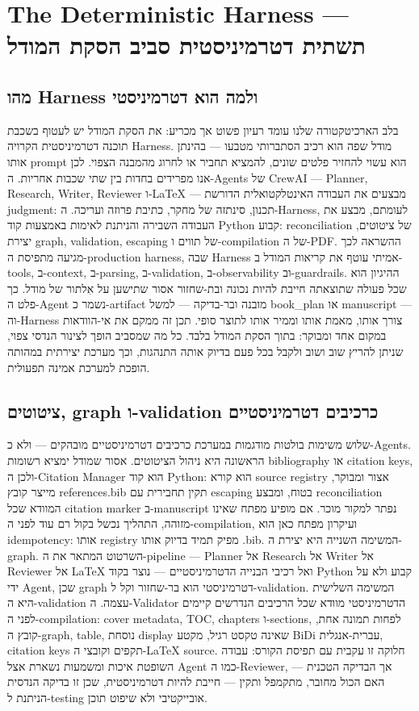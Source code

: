 \chapter{The Deterministic Harness — תשתית דטרמיניסטית סביב הסקת המודל}
\section{מהו Harness ולמה הוא דטרמיניסטי}
בלב הארכיטקטורה שלנו עומד רעיון פשוט אך מכריע: את הסקת המודל יש לעטוף בשכבת תוכנה דטרמיניסטית הקרויה Harness. מודל שפה הוא רכיב הסתברותי מטבעו — בהינתן אותו prompt הוא עשוי להחזיר פלטים שונים, להמציא תחביר או לחרוג מהמבנה הצפוי. לכן אנו מפרידים בחדות בין שתי שכבות אחריות. ה-Agents של CrewAI — Planner, Research, Writer, Reviewer ו-LaTeX — מבצעים את העבודה האינטלקטואלית הדורשת judgment: תכנון, סינתזה של מחקר, כתיבת פרוזה ועריכה. ה-Harness, לעומתם, מבצע את העבודה השבירה והניתנת לאימות באמצעות קוד Python קבוע: reconciliation של ציטוטים, יצירת graph, validation, escaping של תווים ו-compilation של ה-PDF. ההשראה לכך מגיעה מתפיסת ה-production harness, שבה Harness אמיתי עוטף את קריאות המודל ב-tools, ב-context, ב-parsing, ב-validation, ב-observability וב-guardrails. ההיגיון הוא שכל פעולה שתוצאתה חייבת להיות נכונה ובת-שחזור אסור שתישען על אִלתור של מודל. כך פלט ה-Agent נשמר כ-artifact מובנה ובר-בדיקה — למשל book\_plan או manuscript — וה-Harness צורך אותו, מאמת אותו וממיר אותו לתוצר סופי. תכן זה ממקם את אי-הוודאות במקום אחד ומבוקר: בתוך הסקת המודל בלבד. כל מה שמסביב הופך לצינור הנדסי צפוי, שניתן להריץ שוב ושוב ולקבל בכל פעם בדיוק אותה התנהגות, וכך מערכת יצירתית במהותה הופכת למערכת אמינה תפעולית.

\section{ציטוטים, graph ו-validation כרכיבים דטרמיניסטיים}
שלוש משימות בולטות מודגמות במערכת כרכיבים דטרמיניסטיים מובהקים — ולא כ-Agents. הראשונה היא ניהול הציטוטים. אסור שמודל ימציא רשומות bibliography או citation keys, ולכן ה-Citation Manager הוא קוד Python: הוא קורא source registry אצור ומבוקר, מייצר קובץ references.bib תקין תחבירית עם escaping בטוח, ומבצע reconciliation המוודא שכל citation marker ב-manuscript נפתר למקור מוכר. אם מופיע מפתח שאינו מזוהה, התהליך נכשל בקול רם עוד לפני ה-compilation, ועיקרון מפתח כאן הוא idempotency: אותו registry מפיק תמיד בדיוק אותו .bib. המשימה השנייה היא יצירת ה-graph. השרטוט המתאר את ה-pipeline — Planner אל Research אל Writer אל Reviewer אל LaTeX ואל רכיבי הבנייה הדטרמיניסטיים — נוצר בקוד Python קבוע ולא על ידי Agent, שכן graph דטרמיניסטי הוא בר-שחזור וקל ל-validation. המשימה השלישית היא ה-validation עצמה. ה-Validator הדטרמיניסטי מוודא שכל הרכיבים הנדרשים קיימים לפני ה-compilation: cover metadata, TOC, chapters ו-sections, לפחות תמונה אחת, קובץ ה-graph, table, נוסחת display שאינה טקסט רגיל, מקטע BiDi עברית-אנגלית, citation keys תקפים וקובצי ה-LaTeX source. חלוקה זו עקבית עם תפיסת הקורס: עבודה השופטת איכות ומשמעות נשארת אצל Agent כמו ה-Reviewer, אך הבדיקה הטכנית — האם הכול מחובר, מתקמפל ותקין — חייבת להיות דטרמיניסטית, שכן זו בדיקה הנדסית הניתנת ל-testing אובייקטיבי ולא שיפוט תוכן.

